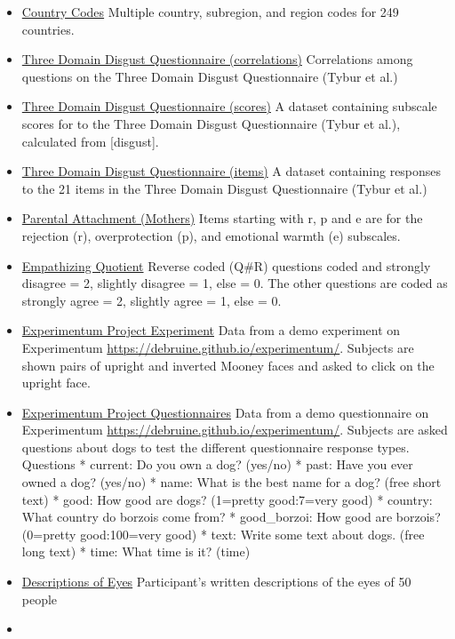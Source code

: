 \documentclass[
  oneside]{book}
\providecommand{\tightlist}{%
  \setlength{\itemsep}{0pt}\setlength{\parskip}{0pt}}
\begin{document}
\begin{itemize}
\tightlist
\item
  \href{data/country_codes.csv}{Country Codes} Multiple country, subregion, and region codes for 249 countries.
\item
  \href{data/disgust_cors.csv}{Three Domain Disgust Questionnaire (correlations)} Correlations among questions on the Three Domain Disgust Questionnaire (Tybur et al.)
\item
  \href{data/disgust_scores.csv}{Three Domain Disgust Questionnaire (scores)} A dataset containing subscale scores for to the Three Domain Disgust Questionnaire (Tybur et al.), calculated from {[}disgust{]}.
\item
  \href{data/disgust.csv}{Three Domain Disgust Questionnaire (items)} A dataset containing responses to the 21 items in the Three Domain Disgust Questionnaire (Tybur et al.)
\item
  \href{data/EMBU_mother.csv}{Parental Attachment (Mothers)} Items starting with r, p and e are for the rejection (r), overprotection (p), and emotional warmth (e) subscales.
\item
  \href{data/eq_data.csv}{Empathizing Quotient} Reverse coded (Q\#R) questions coded and strongly disagree = 2, slightly disagree = 1, else = 0. The other questions are coded as strongly agree = 2, slightly agree = 1, else = 0.
\item
  \href{data/experimentum_exps.csv}{Experimentum Project Experiment} Data from a demo experiment on Experimentum \url{https://debruine.github.io/experimentum/}. Subjects are shown pairs of upright and inverted Mooney faces and asked to click on the upright face.
\item
  \href{data/experimentum_quests.csv}{Experimentum Project Questionnaires} Data from a demo questionnaire on Experimentum \url{https://debruine.github.io/experimentum/}. Subjects are asked questions about dogs to test the different questionnaire response types. Questions * current: Do you own a dog? (yes/no) * past: Have you ever owned a dog? (yes/no) * name: What is the best name for a dog? (free short text) * good: How good are dogs? (1=pretty good:7=very good) * country: What country do borzois come from? * good\_borzoi: How good are borzois? (0=pretty good:100=very good) * text: Write some text about dogs. (free long text) * time: What time is it? (time)
\item
  \href{data/eye_descriptions.csv}{Descriptions of Eyes} Participant's written descriptions of the eyes of 50 people
\item

\end{itemize}
\end{document}
